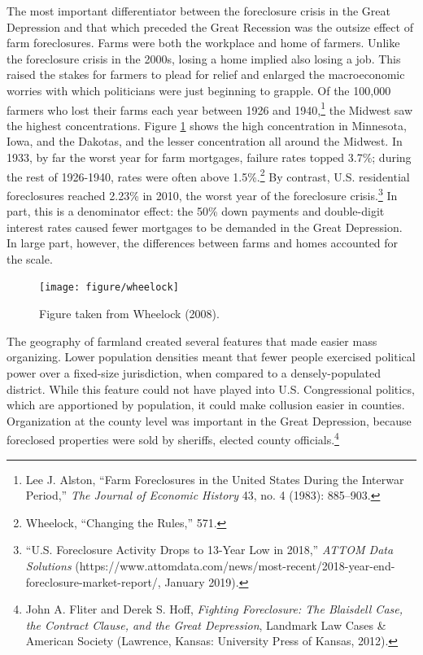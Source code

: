 \documentclass[12pt,oneside]{psthesis}
\begin{document}
The most important differentiator between the foreclosure crisis in the Great Depression and that which preceded the Great Recession was the outsize effect of farm foreclosures.
Farms were both the workplace and home of farmers.
Unlike the foreclosure crisis in the 2000s, losing a home implied also losing a job.
This raised the stakes for farmers to plead for relief and enlarged the macroeconomic worries with which politicians were just beginning to grapple.
Of the 100,000 farmers who lost their farms each year between 1926 and 1940,\footnote{Lee J. Alston, ``Farm Foreclosures in the United States During the Interwar Period,'' \emph{The Journal of Economic History} 43, no. 4 (1983): 885--903.} the Midwest saw the highest concentrations.
Figure \ref{fig:wheelock-farms} shows the high concentration in Minnesota, Iowa, and the Dakotas, and the lesser concentration all around the Midwest.
In 1933, by far the worst year for farm mortgages, failure rates topped 3.7\%; during the rest of 1926-1940, rates were often above 1.5\%.\footnote{Wheelock, ``Changing the Rules,'' 571.}
By contrast, U.S. residential foreclosures reached 2.23\% in 2010, the worst year of the foreclosure crisis.\footnote{``U.S. Foreclosure Activity Drops to 13-Year Low in 2018,'' \emph{ATTOM Data Solutions} (https://www.attomdata.com/news/most-recent/2018-year-end-foreclosure-market-report/, January 2019).}
In part, this is a denominator effect: the 50\% down payments and double-digit interest rates caused fewer mortgages to be demanded in the Great Depression.
In large part, however, the differences between farms and homes accounted for the scale.
\begin{figure}

{\centering \texttt{[image: figure/wheelock]} 

}

\caption{Figure taken from Wheelock (2008).}\label{fig:wheelock-farms}
\end{figure}
The geography of farmland created several features that made easier mass organizing.
Lower population densities meant that fewer people exercised political power over a fixed-size jurisdiction, when compared to a densely-populated district.
While this feature could not have played into U.S. Congressional politics, which are apportioned by population, it could make collusion easier in counties.
Organization at the county level was important in the Great Depression, because foreclosed properties were sold by sheriffs, elected county officials.\footnote{John A. Fliter and Derek S. Hoff, \emph{Fighting Foreclosure: The Blaisdell Case, the Contract Clause, and the Great Depression}, Landmark Law Cases \& American Society (Lawrence, Kansas: University Press of Kansas, 2012).}
\end{document}
